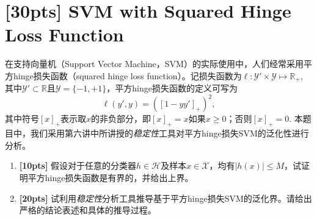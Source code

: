 \documentclass[a4paper,UTF8]{article}
\numberwithin{equation}{section}
\begin{document}
	\section{[30pts] SVM with Squared Hinge Loss Function}
	在支持向量机（Support Vector Machine，SVM）的实际使用中，人们经常采用平方hinge损失函数（squared hinge loss function）。记损失函数为$\ell: \mathcal{Y}'\times \mathcal{Y} \mapsto \mathbb{R}_+$, 其中$\mathcal{Y}' \subset \mathbb{R}$且$\mathcal{Y} = \{-1,+1\}$，平方hinge损失函数的定义可写为
	\begin{equation}
	\label{eq:squared-hinge-loss}
	\ell(y',y) = ([1-yy']_+)^2,
	\end{equation}
	其中符号$[x]_+$表示取$x$的非负部分，即$[x]_+ = x$如果$x\geq 0$；否则$[x]_+ = 0$. 本题目中，我们采用第六讲中所讲授的\emph{稳定性}工具对平方hinge损失SVM的泛化性进行分析。
	
	\begin{enumerate}[ {(}1{)}]
		\item \textbf{[10pts]} 假设对于任意的分类器$h\in \mathcal{H}$及样本$x\in \mathcal{X}$，均有$\lvert h(x) \rvert \leq M$，试证明平方hinge损失函数是有界的，并给出上界。
		\item \textbf{[20pts]} 试利用\emph{稳定性}分析工具推导基于平方hinge损失SVM的泛化界。请给出严格的结论表述和具体的推导过程。
	\end{enumerate}
	
\end{document}
